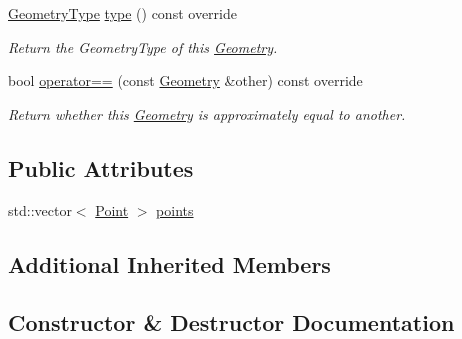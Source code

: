 \begin{DoxyCompactItemize}
\hyperlink{group___geometry_module_gad9a3ec0b998629dbcf8274512700964a}{Geometry\+Type} \hyperlink{structdg_1_1deepcore_1_1geometry_1_1_line_string_a918485a027776c69d8f1eab724438930}{type} () const override
\begin{DoxyCompactList}\small\item\em Return the Geometry\+Type of this \hyperlink{structdg_1_1deepcore_1_1geometry_1_1_geometry}{Geometry}. \end{DoxyCompactList}\item 
bool \hyperlink{structdg_1_1deepcore_1_1geometry_1_1_line_string_ae84bb6007046ef5568255965bbdf78c7}{operator==} (const \hyperlink{structdg_1_1deepcore_1_1geometry_1_1_geometry}{Geometry} \&other) const override
\begin{DoxyCompactList}\small\item\em Return whether this \hyperlink{structdg_1_1deepcore_1_1geometry_1_1_geometry}{Geometry} is approximately equal to another. \end{DoxyCompactList}\end{DoxyCompactItemize}
\subsection*{Public Attributes}
\begin{DoxyCompactItemize}
\item 
std\+::vector$<$ \hyperlink{structdg_1_1deepcore_1_1geometry_1_1_point}{Point} $>$ \hyperlink{structdg_1_1deepcore_1_1geometry_1_1_line_string_a7f030a2603076ad9d9ddc0d752c30ff5}{points}
\end{DoxyCompactItemize}
\subsection*{Additional Inherited Members}


\subsection{Constructor \& Destructor Documentation}

